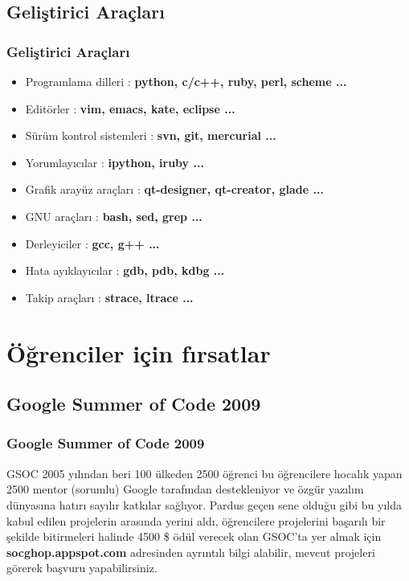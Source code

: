 \documentclass{beamer}
\begin{document}
\subsection{Geliştirici Araçları}
\frame
{
    \frametitle{Geliştirici Araçları}
	\begin{itemize}
        \item Programlama dilleri : \textbf{python, c/c++, ruby, perl, scheme ...}
        \item Editörler : \textbf{vim, emacs, kate, eclipse ...}
        \item Sürüm kontrol sistemleri : \textbf{svn, git, mercurial ...}
        \item Yorumlayıcılar : \textbf{ipython, iruby ...}
        \item Grafik arayüz araçları : \textbf{qt-designer, qt-creator, glade ...}
        \item GNU araçları : \textbf{bash, sed, grep ...}
        \item Derleyiciler : \textbf{gcc, g++ ...}
        \item Hata ayıklayıcılar : \textbf{gdb, pdb, kdbg ...}
        \item Takip araçları : \textbf{strace, ltrace ...}
	\end{itemize}
}

\section{Öğrenciler için fırsatlar}

\subsection{Google Summer of Code 2009}
\frame
{
    \frametitle{Google Summer of Code 2009}
    \begin{block}{GSOC}
        2005 yılından beri 100 ülkeden 2500 öğrenci bu öğrencilere hocalık yapan 2500 mentor (sorumlu) Google tarafından destekleniyor ve özgür yazılım dünyasına hatırı sayılır katkılar sağlıyor. Pardus geçen sene olduğu gibi bu yılda kabul edilen projelerin arasında yerini aldı, öğrencilere projelerini başarılı bir şekilde bitirmeleri halinde 4500 \$ ödül verecek olan GSOC'ta yer almak için \textbf{socghop.appspot.com} adresinden ayrıntılı bilgi alabilir, mevcut projeleri görerek başvuru yapabilirsiniz.
    \end{block}
}
\end{document}
